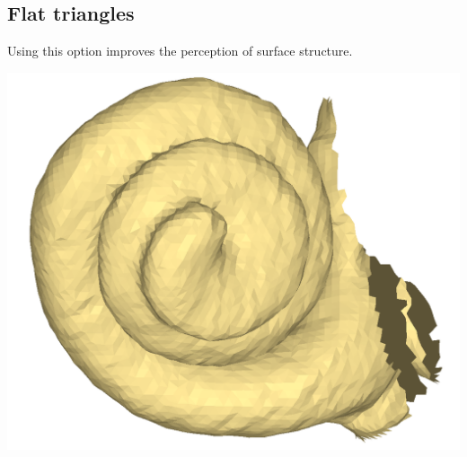 \noindent
\begin{minipage}{0.55\textwidth}

\subsection{Flat triangles}
Using this option improves the perception of surface structure.

\end{minipage}  
 \begin{minipage}{0.45\textwidth}\centering
\includegraphics[scale=0.1]{images/Viewing_options/Triangles.png}

 \end{minipage} 
\noindent

